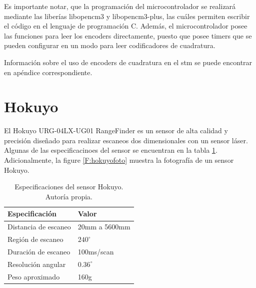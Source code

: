 Es importante notar, que la programación del microcontrolador se realizará mediante las liberías libopencm3 y libopencm3-plus, las cuáles permiten escribir el código en el lenguaje de programación C. Además, el microcontrolador posee las funciones para leer los encoders directamente, puesto que posee timers que se pueden configurar en un modo para leer codificadores de cuadratura.

Información sobre el uso de encoders de cuadratura en el stm se puede encontrar en apéndice correspondiente.

\section{Hokuyo}

El Hokuyo URG-04LX-UG01 RangeFinder es un sensor de alta calidad y precisión diseñado para realizar escaneos dos dimensionales con un sensor láser. Algunas de las especificacinoes del sensor se encuentran en la tabla \ref{T:hokuyo}. Adicionalmente, la figure \ref{F:hokuyofoto} muestra la fotografía de un sensor Hokuyo.

\begin{table}[H]
\caption{Especificaciones del sensor Hokuyo. Autoría propia.}
\begin{tabular}{|l|l|}
\hline
Especificación       & Valor         \\ \hline
Distancia de escaneo & 20mm a 5600mm \\ \hline
Región de escaneo    & $240^\circ$           \\ \hline
Duración de escaneo  & 100ms/scan    \\ \hline
Resolución angular   & $0.36^\circ$ \\ \hline
Peso aproximado & 160g \\ \hline
\end{tabular}
\label{T:hokuyo}
\end{table}

